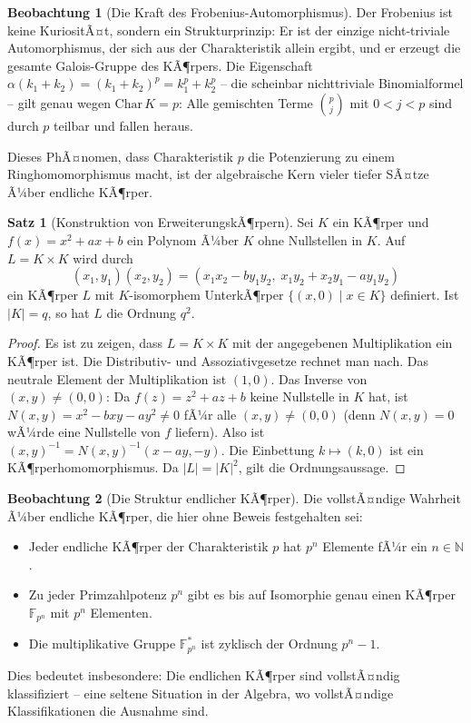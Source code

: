 ﻿\documentclass[a4paper,12pt]{report}
\theoremstyle{definition}
\newtheorem{satz}{Satz}
\newtheorem{beobachtung}{Beobachtung}
\begin{document}
\begin{beobachtung}[Die Kraft des Frobenius-Automorphismus]
    Der Frobenius ist keine KuriositÃ¤t, sondern ein Strukturprinzip:
    Er ist der einzige nicht-triviale Automorphismus, der sich aus der
    Charakteristik allein ergibt, und er erzeugt die gesamte Galois-Gruppe
    des KÃ¶rpers. Die Eigenschaft $\alpha(k_1 + k_2) = (k_1 + k_2)^p =
    k_1^p + k_2^p$ -- die scheinbar nichttriviale Binomialformel -- gilt
    genau wegen $\mathrm{Char}\, K = p$: Alle gemischten Terme
    $\binom{p}{j}$ mit $0 < j < p$ sind durch $p$ teilbar und fallen heraus.

    Dieses PhÃ¤nomen, dass Charakteristik $p$ die Potenzierung zu einem
    Ringhomomorphismus macht, ist der algebraische Kern vieler tiefer
    SÃ¤tze Ã¼ber endliche KÃ¶rper.
\end{beobachtung}

\begin{satz}[Konstruktion von ErweiterungskÃ¶rpern]
    Sei $K$ ein KÃ¶rper und $f(x) = x^2 + ax + b$ ein Polynom Ã¼ber $K$
    ohne Nullstellen in $K$. Auf $L = K \times K$ wird durch
    \[
        (x_1, y_1)(x_2, y_2) = (x_1 x_2 - b y_1 y_2,\; x_1 y_2 + x_2 y_1 - a y_1 y_2)
    \]
    ein KÃ¶rper $L$ mit $K$-isomorphem UnterkÃ¶rper $\{(x, 0) \mid x \in K\}$
    definiert. Ist $|K| = q$, so hat $L$ die Ordnung $q^2$.
\end{satz}
\begin{proof}
    Es ist zu zeigen, dass $L = K \times K$ mit der angegebenen Multiplikation
    ein KÃ¶rper ist. Die Distributiv- und Assoziativgesetze rechnet man nach.
    Das neutrale Element der Multiplikation ist $(1, 0)$.
    Das Inverse von $(x, y) \neq (0, 0)$: Da $f(z) = z^2 + az + b$ keine
    Nullstelle in $K$ hat, ist $N(x,y) = x^2 - bxy - ay^2 \neq 0$ fÃ¼r alle
    $(x,y) \neq (0,0)$ (denn $N(x,y) = 0$ wÃ¼rde eine Nullstelle von $f$ liefern).
    Also ist $(x,y)^{-1} = N(x,y)^{-1}(x - ay, -y)$.
    Die Einbettung $k \mapsto (k,0)$ ist ein KÃ¶rperhomomorphismus.
    Da $|L| = |K|^2$, gilt die Ordnungsaussage.
\end{proof}


\begin{beobachtung}[Die Struktur endlicher KÃ¶rper]
    Die vollstÃ¤ndige Wahrheit Ã¼ber endliche KÃ¶rper, die hier ohne Beweis
    festgehalten sei:
    \begin{itemize}
        \item[-] Jeder endliche KÃ¶rper der Charakteristik $p$ hat $p^n$ Elemente
              fÃ¼r ein $n \in \mathbb{N}$.
        \item[-] Zu jeder Primzahlpotenz $p^n$ gibt es bis auf Isomorphie genau
              einen KÃ¶rper $\mathbb{F}_{p^n}$ mit $p^n$ Elementen.
        \item[-] Die multiplikative Gruppe $\mathbb{F}_{p^n}^*$ ist zyklisch der
              Ordnung $p^n - 1$.
    \end{itemize}
    Dies bedeutet insbesondere: Die endlichen KÃ¶rper sind vollstÃ¤ndig
    klassifiziert -- eine seltene Situation in der Algebra, wo vollstÃ¤ndige
    Klassifikationen die Ausnahme sind.
\end{beobachtung}
\end{document}
